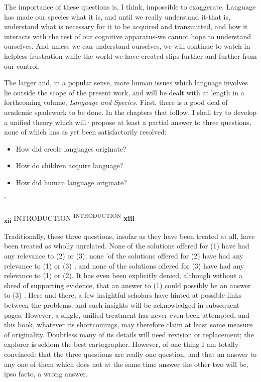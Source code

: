 The importance of these questions is, I think, impossible to exaggerate. Language has made our species what it is, and until we really understand it-that is, understand what is necessary for it to be acquired and transmitted, and how it interacts with the rest of our cognitive apparatus-we cannot hope to understand ourselves. And unless we can understand ourselves, we will continue to watch in helpless frustration while the world we have created slips further and further from our control.

The larger and, in a popular sense, more human issues which language involves lie outside the scope of the present work, and will be dealt with at length in a forthcoming volume, \textit{Language} \textit{and} \textit{Species.} First, there is a good deal of academic spadework to be done. In the chapters that follow, I shall try to develop a unified theory which will·propose at least a partial answer to three questions, none of which has as yet been satisfactorily resolved:


\begin{itemize}
\item How did creole languages originate?
\item How do children acquire language?
\item How did human language originate?
\end{itemize}

'

\textbf{\textsubscript{xii }}INTRODUCTION \textsuperscript{INTRODUCTION} \textbf{xiii}

Traditionally, these three questions, insofar as they have been treated at all, have been treated as wholly unrelated. None of the solutions offered for (1) have had any relevance to (2) or (3); none 'of the solu\-tions offered for (2) have had any relevance to (1) or (3) ; and none of the solutions offered for (3) have had any relevance to (1) or (2). It has even been explicitly denied, although without a shred of support\-ing evidence, that an answer to (1) could possibly be an answer to (3) \citep{Sankoff1979}. Here and there, a few insightful scholars have hinted at possible links between the problems, and such insights will be ac\-knowledged in subsequent pages. However, a single, unified treatment has never even been attempted, and this book, whatever its short\-comings, may therefore claim at least some measure of originality. Doubtless many of its details will need revision or replacement; the explorer is seldom the best cartographer. However, of one thing I am totally convinced: that the three questions are really one question, and that an answer to any one of them which does not at the same time answer the other two will be, ipso facto, a wrong answer.

